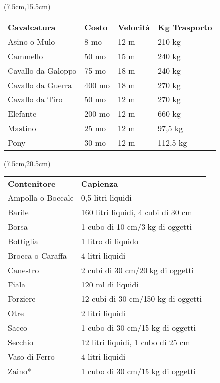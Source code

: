 \documentclass[a4paper,12 pt,openany]{book}
\begin{document}
	\begin{textblock*}{12.5cm}(7.5cm,15.5cm) %

\begin{tabular}{llll}
	\textbf{Cavalcatura}&\textbf{Costo}&\textbf{Velocità}&\textbf{Kg Trasporto}\\
	
	Asino o Mulo&8 mo&12 m&210 kg\\
	Cammello&50 mo&15 m&240 kg\\
	Cavallo da Galoppo&75 mo&18 m&240 kg\\
	Cavallo da Guerra&400 mo&18 m&270 kg\\
	Cavallo da Tiro&50 mo&12 m&270 kg\\
	Elefante&200 mo&12 m&660 kg\\
	Mastino&25 mo&12 m&97,5 kg\\
	Pony&30 mo&12 m&112,5 kg\\
\end{tabular}

\end{textblock*}

	\begin{textblock*}{12.5cm}(7.5cm,20.5cm) %

\begin{tabular}{ll}

	\textbf{Contenitore}&\textbf{Capienza}\\
	Ampolla o Boccale&0,5 litri liquidi\\
	Barile&			160 litri liquidi, 4 cubi di 30 cm\\
	Borsa&			1 cubo di 10 cm/3 kg di oggetti\\
	Bottiglia&		1 litro di liquido\\
	Brocca o Caraffa&4 litri liquidi\\
	Canestro&		2 cubi di 30 cm/20 kg di oggetti\\
	Fiala&			120 ml di liquidi\\
	Forziere&		12 cubi di 30 cm/150 kg di oggetti\\
	Otre&			2 litri liquidi\\
	Sacco&			1 cubo di 30 cm/15 kg di oggetti\\
	Secchio&		12 litri liquidi, 1 cubo di 25 cm\\
	Vaso di Ferro&	4 litri liquidi\\
	Zaino*&			1 cubo di 30 cm/15 kg di oggetti\\
\end{tabular}
\end{textblock*}
\end{document}
